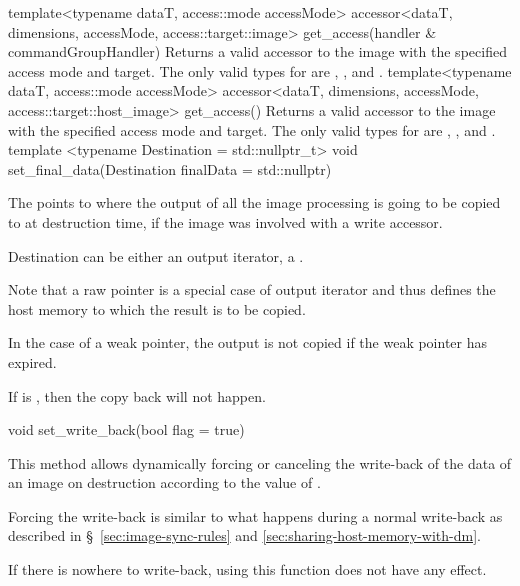   \addRowThreeSL
    {template<typename dataT, access::mode accessMode>}
    {accessor<dataT, dimensions, accessMode, access::target::image> }
    {get_access(handler \& commandGroupHandler)}
    {
      Returns a valid accessor to the image with the specified
      access mode and target. The only valid types for  are , ,  and .
    }
     \addRowThreeSL
    {template<typename dataT, access::mode accessMode>}
    {accessor<dataT, dimensions, accessMode, access::target::host_image> }
    {get_access()}
    {
      Returns a valid accessor to the image with the specified
      access mode and target. The only valid types for  are , ,  and .
    }
   \addRowTwoL
    {template <typename Destination = std::nullptr_t>}
    {void set_final_data(Destination finalData = std::nullptr)}
    {

      The  points to where the output of all
      the image processing is going to be copied to at destruction
      time, if the image was involved with a write accessor.

      Destination can be either an output iterator, a
      .

      Note that a raw pointer is a special case of output iterator and
      thus defines the host memory to which the result is to be
      copied.

      In the case of a weak pointer, the output is not copied if the
      weak pointer has expired.

      If  is , then
      the copy back will not happen.

    }

   \addRow
    {void set_write_back(bool flag = true)}
    {
      This method allows dynamically forcing or canceling the
      write-back of the data of an image on destruction according to
      the value of .

      Forcing the write-back is similar to what happens during a
      normal write-back as described in \S~\ref{sec:image-sync-rules}
      and \ref{sec:sharing-host-memory-with-dm}.

      If there is nowhere to write-back, using this function does not
      have any effect.
    }
\completeInfoTable

